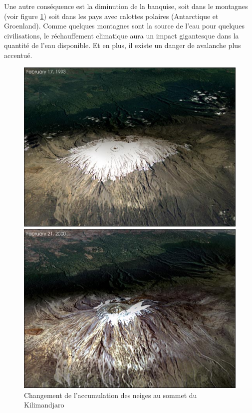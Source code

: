 \documentclass[a4paper,11pt]{article}
\begin{document}
Une autre conséquence  est la diminution de la banquise,  soit dans le montagnes
(voir figure \ref{fig:kili}) soit dans les pays avec calottes polaires (Antarctique et Groenland).
Comme quelques montagnes sont la source de l'eau pour quelques civilisations, le
réchauffement climatique  aura un impact  gigantesque dans la quantité  de l'eau
disponible. Et en plus, il existe un danger de avalanche plus accentué.

\begin{figure}[H]
  \begin{centering}
    \includegraphics[scale=0.3]{fig/kili}
    \par\end{centering}
  \caption{Changement de l'accumulation des neiges au sommet du Kilimandjaro}
  \label{fig:kili}
\end{figure}
\end{document}
